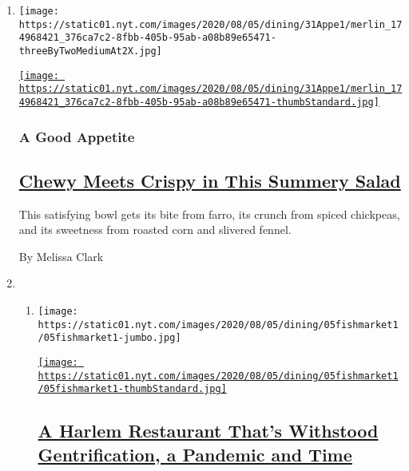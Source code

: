 \begin{enumerate}
\def\labelenumi{\arabic{enumi}.}
\item
  \texttt{[image: https://static01.nyt.com/images/2020/08/05/dining/31Appe1/merlin\_174968421\_376ca7c2-8fbb-405b-95ab-a08b89e65471-threeByTwoMediumAt2X.jpg]}

  \href{/2020/07/31/dining/farro-corn-chickpea-salad-recipe.html}{\texttt{[image: https://static01.nyt.com/images/2020/08/05/dining/31Appe1/merlin\_174968421\_376ca7c2-8fbb-405b-95ab-a08b89e65471-thumbStandard.jpg]}}

  \hypertarget{a-good-appetite}{%
  \subsubsection{A Good Appetite}\label{a-good-appetite}}

  \hypertarget{chewy-meets-crispy-in-this-summery-salad}{%
  \subsection{\texorpdfstring{\href{/2020/07/31/dining/farro-corn-chickpea-salad-recipe.html}{Chewy
  Meets Crispy in This Summery
  Salad}}{Chewy Meets Crispy in This Summery Salad}}\label{chewy-meets-crispy-in-this-summery-salad}}

  This satisfying bowl gets its bite from farro, its crunch from spiced
  chickpeas, and its sweetness from roasted corn and slivered fennel.

  By Melissa Clark
\item
  \begin{enumerate}
  \def\labelenumii{\arabic{enumii}.}
  \item
    \texttt{[image: https://static01.nyt.com/images/2020/08/05/dining/05fishmarket1/05fishmarket1-jumbo.jpg]}

    \href{/2020/07/30/dining/famous-fish-market-harlem.html}{\texttt{[image: https://static01.nyt.com/images/2020/08/05/dining/05fishmarket1/05fishmarket1-thumbStandard.jpg]}}

    \hypertarget{a-harlem-restaurant-thats-withstood-gentrification-a-pandemic-and-time}{%
    \subsection{\texorpdfstring{\href{/2020/07/30/dining/famous-fish-market-harlem.html}{A
    Harlem Restaurant That's Withstood Gentrification, a Pandemic and
    Time}}{A Harlem Restaurant That's Withstood Gentrification, a Pandemic and Time}}\label{a-harlem-restaurant-thats-withstood-gentrification-a-pandemic-and-time}}


\end{enumerate}
\end{enumerate}
